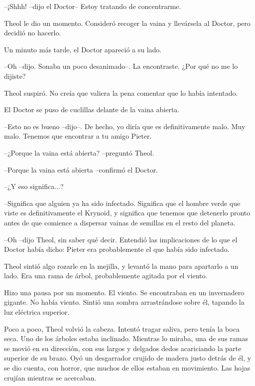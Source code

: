 --¡Shhh! --dijo el Doctor-- Estoy tratando de concentrarme.



Theol le dio un momento. Consideró recoger la vaina y llevársela al Doctor, pero decidió no hacerlo.



Un minuto más tarde, el Doctor apareció a su lado.

--Oh --dijo. Sonaba un poco desanimado--. La encontraste. ¿Por qué no me lo dijiste?



Theol suspiró. No creía que valiera la pena comentar que lo había intentado.



El Doctor se puso de cuclillas delante de la vaina abierta.

--Esto no es bueno --dijo--. De hecho, yo diría que es definitivamente malo. Muy malo. Tenemos que encontrar a tu amigo Pieter.



--¿Porque la vaina está abierta? --preguntó Theol.



--Porque la vaina está abierta --confirmó el Doctor.



--¿Y eso significa...?



--Significa que alguien ya ha sido infectado. Significa que el hombre verde que viste es definitivamente el Krynoid, y significa que tenemos que detenerlo pronto antes de que comience a dispersar vainas de semillas en el resto del planeta.



--Oh --dijo Theol, sin saber qué decir. Entendió las implicaciones de lo que el Doctor había dicho: Pieter era probablemente el que había sido infectado.



Theol sintió algo rozarle en la mejilla, y levantó la mano para apartarlo a un lado. Era una rama de árbol, probablemente agitada por el viento.



Hizo una pausa por un momento. El viento. Se encontraban en un invernadero gigante. No había viento. Sintió una sombra arrastrándose sobre él, tapando la luz eléctrica superior.



Poco a poco, Theol volvió la cabeza. Intentó tragar saliva, pero tenía la boca seca. Uno de los árboles estaba inclinado. Mientras lo miraba, una de sus ramas se movió en su dirección, con sus largos y delgados dedos acariciando la parte superior de su brazo. Oyó un desgarrador crujido de madera justo detrás de él, y se dio cuenta, con horror, que muchos de ellos estaban en movimiento. Las hojas crujían mientras se acercaban.



